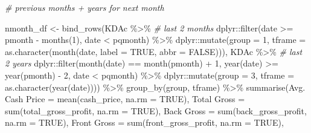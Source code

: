 \documentclass[
]{article}
\newenvironment{Shaded}{\begin{snugshade}}{\end{snugshade}}
\newcommand{\AttributeTok}[1]{\textcolor[rgb]{0.77,0.63,0.00}{#1}}
\newcommand{\CommentTok}[1]{\textcolor[rgb]{0.56,0.35,0.01}{\textit{#1}}}
\newcommand{\ConstantTok}[1]{\textcolor[rgb]{0.00,0.00,0.00}{#1}}
\newcommand{\DecValTok}[1]{\textcolor[rgb]{0.00,0.00,0.81}{#1}}
\newcommand{\FunctionTok}[1]{\textcolor[rgb]{0.00,0.00,0.00}{#1}}
\newcommand{\NormalTok}[1]{#1}
\newcommand{\OtherTok}[1]{\textcolor[rgb]{0.56,0.35,0.01}{#1}}
\newcommand{\SpecialCharTok}[1]{\textcolor[rgb]{0.00,0.00,0.00}{#1}}
\newcommand{\StringTok}[1]{\textcolor[rgb]{0.31,0.60,0.02}{#1}}
\begin{document}
\begin{Shaded}
\begin{Highlighting}[]
\CommentTok{\# previous months + years for next month}

\NormalTok{nmonth\_df }\OtherTok{\textless{}{-}} \FunctionTok{bind\_rows}\NormalTok{(KDAc }\SpecialCharTok{\%\textgreater{}\%} \CommentTok{\# last 2 months}
\NormalTok{                   dplyr}\SpecialCharTok{::}\FunctionTok{filter}\NormalTok{(date }\SpecialCharTok{\textgreater{}=}\NormalTok{ pmonth }\SpecialCharTok{{-}} \FunctionTok{months}\NormalTok{(}\DecValTok{1}\NormalTok{), date }\SpecialCharTok{\textless{}}\NormalTok{ pqmonth) }\SpecialCharTok{\%\textgreater{}\%}
\NormalTok{                   dplyr}\SpecialCharTok{::}\FunctionTok{mutate}\NormalTok{(}\AttributeTok{group =} \DecValTok{1}\NormalTok{, }\AttributeTok{tframe =} \FunctionTok{as.character}\NormalTok{(}\FunctionTok{month}\NormalTok{(date, }\AttributeTok{label =} \ConstantTok{TRUE}\NormalTok{, }\AttributeTok{abbr =} \ConstantTok{FALSE}\NormalTok{))),}
\NormalTok{                 KDAc }\SpecialCharTok{\%\textgreater{}\%} \CommentTok{\# last 2 years}
\NormalTok{                   dplyr}\SpecialCharTok{::}\FunctionTok{filter}\NormalTok{(}\FunctionTok{month}\NormalTok{(date) }\SpecialCharTok{==} \FunctionTok{month}\NormalTok{(pmonth) }\SpecialCharTok{+} \DecValTok{1}\NormalTok{, }\FunctionTok{year}\NormalTok{(date) }\SpecialCharTok{\textgreater{}=} \FunctionTok{year}\NormalTok{(pmonth) }\SpecialCharTok{{-}} \DecValTok{2}\NormalTok{, date }\SpecialCharTok{\textless{}}\NormalTok{ pqmonth) }\SpecialCharTok{\%\textgreater{}\%}
\NormalTok{                   dplyr}\SpecialCharTok{::}\FunctionTok{mutate}\NormalTok{(}\AttributeTok{group =} \DecValTok{3}\NormalTok{, }\AttributeTok{tframe =} \FunctionTok{as.character}\NormalTok{(}\FunctionTok{year}\NormalTok{(date)))) }\SpecialCharTok{\%\textgreater{}\%}
  \FunctionTok{group\_by}\NormalTok{(group, tframe) }\SpecialCharTok{\%\textgreater{}\%}
  \FunctionTok{summarise}\NormalTok{(}\StringTok{\textasciigrave{}}\AttributeTok{Avg. Cash Price}\StringTok{\textasciigrave{}} \OtherTok{=} \FunctionTok{mean}\NormalTok{(cash\_price, }\AttributeTok{na.rm =} \ConstantTok{TRUE}\NormalTok{),}
            \StringTok{\textasciigrave{}}\AttributeTok{Total Gross}\StringTok{\textasciigrave{}} \OtherTok{=} \FunctionTok{sum}\NormalTok{(total\_gross\_profit, }\AttributeTok{na.rm =} \ConstantTok{TRUE}\NormalTok{),}
            \StringTok{\textasciigrave{}}\AttributeTok{Back Gross}\StringTok{\textasciigrave{}} \OtherTok{=} \FunctionTok{sum}\NormalTok{(back\_gross\_profit, }\AttributeTok{na.rm =} \ConstantTok{TRUE}\NormalTok{),}
            \StringTok{\textasciigrave{}}\AttributeTok{Front Gross}\StringTok{\textasciigrave{}} \OtherTok{=} \FunctionTok{sum}\NormalTok{(front\_gross\_profit, }\AttributeTok{na.rm =} \ConstantTok{TRUE}\NormalTok{),}

\end{Highlighting}
\end{Shaded}
\end{document}
